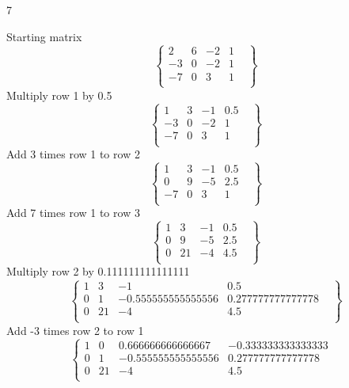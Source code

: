 \documentclass{exercises}
\begin{document}
\begin{exr}{}{7}
\begin{enumerate}
		Starting matrix
\begin{equation}
\left\{
    \begin{array}{ccc|cl}2&6&-2&1&\\-3&0&-2&1&\\-7&0&3&1&\\\end{array}
\right\}
\end{equation}Multiply row 1 by 0.5
\begin{equation}
\left\{
    \begin{array}{ccc|cl}1&3&-1&0.5&\\-3&0&-2&1&\\-7&0&3&1&\\\end{array}
\right\}
\end{equation}Add 3 times row 1 to row 2
\begin{equation}
\left\{
    \begin{array}{ccc|cl}1&3&-1&0.5&\\0&9&-5&2.5&\\-7&0&3&1&\\\end{array}
\right\}
\end{equation}Add 7 times row 1 to row 3
\begin{equation}
\left\{
    \begin{array}{ccc|cl}1&3&-1&0.5&\\0&9&-5&2.5&\\0&21&-4&4.5&\\\end{array}
\right\}
\end{equation}Multiply row 2 by 0.111111111111111
\begin{equation}
\left\{
    \begin{array}{ccc|cl}1&3&-1&0.5&\\0&1&-0.555555555555556&0.277777777777778&\\0&21&-4&4.5&\\\end{array}
\right\}
\end{equation}Add -3 times row 2 to row 1
\begin{equation}
\left\{
    \begin{array}{ccc|cl}1&0&0.666666666666667&-0.333333333333333&\\0&1&-0.555555555555556&0.277777777777778&\\0&21&-4&4.5&\\\end{array}

\end{equation}
\end{enumerate}
\end{exr}
\end{document}

